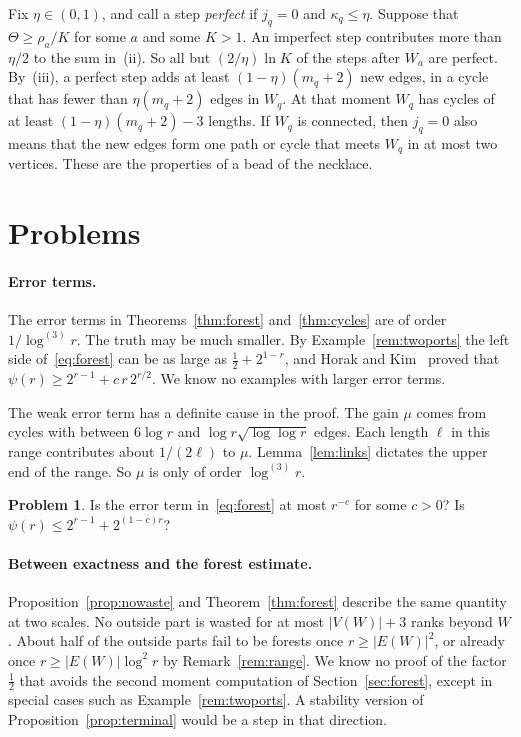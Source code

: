 \documentclass[11pt]{article}
\theoremstyle{definition}
\newtheorem{problem}[theorem]{Problem}
\theoremstyle{remark}
\newcommand{\lgk}[1]{\log^{(#1)}}
\newcommand{\half}{\tfrac12}
\begin{document}
Fix $\eta\in(0,1)$, and call a step \emph{perfect} if $j_q=0$ and $\kappa_q\le\eta$. Suppose that
$\Theta\ge\rho_a/K$ for some $a$ and some $K>1$. An imperfect step contributes more than $\eta/2$ to
the sum in~(ii). So all but $(2/\eta)\ln K$ of the steps after $W_a$ are perfect. By~(iii), a
perfect step adds at least $(1-\eta)(m_q+2)$ new edges, in a cycle that has fewer than
$\eta(m_q+2)$ edges in $W_q$. At that moment $W_q$ has cycles of at least $(1-\eta)(m_q+2)-3$
lengths. If $W_q$ is connected, then $j_q=0$ also means that the new edges form one path or cycle
that meets $W_q$ in at most two vertices. These are the properties of a bead of the necklace.
\section{Problems}\label{sec:problems}

\paragraph{Error terms.}
The error terms in Theorems~\ref{thm:forest} and~\ref{thm:cycles} are of order $1/\lgk3r$. The
truth may be much smaller. By Example~\ref{rem:twoports} the left side of~\eqref{eq:forest} can be
as large as $\half+2^{1-r}$, and Horak and Kim~\cite{HK} proved that
$\psi(r)\ge2^{r-1}+c\,r\,2^{r/2}$. We know no examples with larger error terms.

The weak error term has a definite cause in the proof. The gain $\mu$ comes from cycles with between
$6\log r$ and $\log r\sqrt{\log\log r}$ edges. Each length $\ell$ in this range contributes about
$1/(2\ell)$ to $\mu$. Lemma~\ref{lem:links} dictates the upper end of the range. So $\mu$ is only of
order $\lgk3r$.

\begin{problem}
Is the error term in~\eqref{eq:forest} at most $r^{-c}$ for some $c>0$? Is
$\psi(r)\le2^{r-1}+2^{(1-c)r}$?
\end{problem}

\paragraph{Between exactness and the forest estimate.}
Proposition~\ref{prop:nowaste} and Theorem~\ref{thm:forest} describe the same quantity at two
scales. No outside part is wasted for at most $|V(W)|+3$ ranks beyond $W$. About half of the outside
parts fail to be forests once $r\ge|E(W)|^{2}$, or already once $r\ge|E(W)|\log^{2}r$ by
Remark~\ref{rem:range}. We know no proof of the factor $\half$ that avoids the second moment
computation of Section~\ref{sec:forest}, except in special cases such as
Example~\ref{rem:twoports}. A stability version of Proposition~\ref{prop:terminal} would be a step
in that direction.
\end{document}
